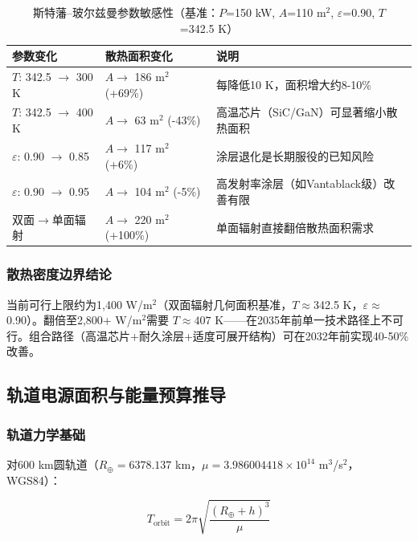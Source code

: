 \begin{table}[H]
  \centering
  \caption{斯特藩--玻尔兹曼参数敏感性（基准：$P$=150 kW, $A$=110 m$^2$, $\varepsilon$=0.90, $T$=342.5 K）}
  \label{tab:sb-sensitivity}
  \small
  \begin{tabularx}{\textwidth}{
    >{\raggedright\arraybackslash}p{2.6cm}
    >{\centering\arraybackslash}p{2.8cm}
    >{\raggedright\arraybackslash}X
  }
  \toprule
  \textbf{参数变化} & \textbf{散热面积变化} & \textbf{说明} \\
  \midrule
  $T$: 342.5 $\to$ 300 K & $A \to$ 186 m$^2$ (+69\%) & 每降低10 K，面积增大约8-10\% \\
  $T$: 342.5 $\to$ 400 K & $A \to$ 63 m$^2$ (-43\%) & 高温芯片（SiC/GaN）可显著缩小散热面积 \\
  $\varepsilon$: 0.90 $\to$ 0.85 & $A \to$ 117 m$^2$ (+6\%) & 涂层退化是长期服役的已知风险 \\
  $\varepsilon$: 0.90 $\to$ 0.95 & $A \to$ 104 m$^2$ (-5\%) & 高发射率涂层（如Vantablack级）改善有限 \\
  双面$\to$单面辐射 & $A \to$ 220 m$^2$ (+100\%) & 单面辐射直接翻倍散热面积需求 \\
  \bottomrule
  \end{tabularx}
\end{table}

\subsubsection{散热密度边界结论}

当前可行上限约为1,400 W/m$^2$（双面辐射几何面积基准，$T\approx$342.5 K，$\varepsilon\approx$0.90）。翻倍至2,800+ W/m$^2$需要 $T \approx 407$ K——在2035年前单一技术路径上不可行。组合路径（高温芯片+耐久涂层+适度可展开结构）可在2032年前实现40-50\%改善。

\subsection{轨道电源面积与能量预算推导}
\label{sec:orbit-power}

\subsubsection{轨道力学基础}

对600 km圆轨道（$R_{\oplus} = 6378.137$ km，$\mu = 3.986004418 \times 10^{14}$ m$^3$/s$^2$，WGS84）：

\begin{equation}
  T_{\text{orbit}} = 2\pi\sqrt{\frac{(R_{\oplus} + h)^{3}}{\mu}}
  \label{eq:orbit-period}
\end{equation}

